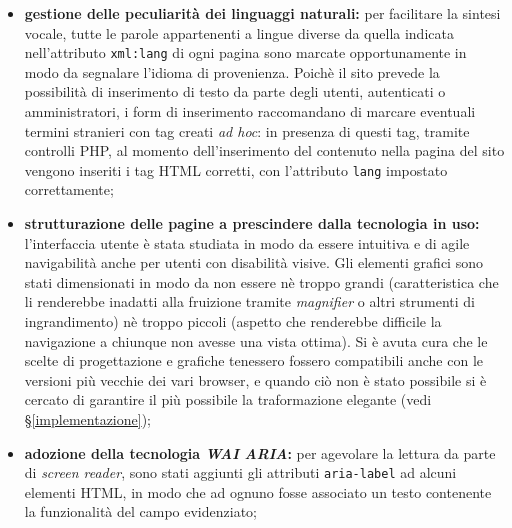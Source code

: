 \begin{itemize}
	\item \textbf{gestione delle peculiarità dei linguaggi naturali:} per facilitare la sintesi vocale, tutte le parole appartenenti a lingue diverse da quella indicata nell'attributo \texttt{xml:lang} di ogni pagina sono marcate opportunamente in modo da segnalare l'idioma di provenienza. Poichè il sito prevede la possibilità di inserimento di testo da parte degli utenti, autenticati o amministratori, i form di inserimento raccomandano di marcare eventuali termini stranieri con tag creati \textit{ad hoc}: in presenza di questi tag, tramite controlli PHP, al momento dell'inserimento del contenuto nella pagina del sito vengono inseriti i tag HTML corretti, con l'attributo \texttt{lang} impostato correttamente;
	
	\item \textbf{strutturazione delle pagine a prescindere dalla tecnologia in uso:} l'interfaccia utente è stata studiata in modo da essere intuitiva e di agile navigabilità anche per utenti con disabilità visive. Gli elementi grafici sono stati dimensionati in modo da non essere nè troppo grandi (caratteristica che li renderebbe inadatti alla fruizione tramite \textit{magnifier} o altri strumenti di ingrandimento) nè troppo piccoli (aspetto che renderebbe difficile la navigazione a chiunque non avesse una vista ottima). Si è avuta cura che le scelte di progettazione e grafiche tenessero fossero compatibili anche con le versioni più vecchie dei vari browser, e quando ciò non è stato possibile si è cercato di garantire il più possibile la traformazione elegante (vedi §\ref{implementazione});
	
	\item \textbf{adozione della tecnologia \textit{WAI ARIA}:} per agevolare la lettura da parte di \textit{screen reader}, sono stati aggiunti gli attributi \texttt{aria-label} ad alcuni elementi HTML, in modo che ad ognuno fosse associato un testo contenente la funzionalità del campo evidenziato;
	

\end{itemize}
